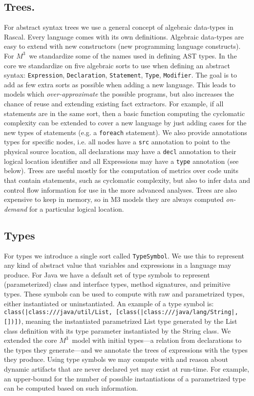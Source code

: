 \documentclass[conference]{IEEEtran}
\newcommand{\loc}[1]{\small{\texttt{#1}}\xspace}
\newcommand{\mthree}{\ensuremath{M^3}\xspace}
\begin{document}
\subsection{Trees.} For abstract syntax trees we use a general concept of
algebraic data-types in Rascal. Every language comes with its own definitions.
Algebraic data-types are easy to extend with new constructors (new programming
language constructs). For \mthree\ we standardize some of the names used in
defining AST types. In the core we standardize on five algebraic sorts to use
when defining an abstract syntax: \texttt{Expression}, \texttt{Declaration},
\texttt{Statement}, \texttt{Type}, \texttt{Modifier}. The goal is to add as
few extra sorts as possible when adding a new language. This leads to models
which \emph{over-approximate} the possible programs, but also increases the
chance of reuse and extending existing fact extractors. For example, if all
statements are in the same sort, then a basic function computing the
cyclomatic complexity can be extended to cover a new language by just adding
cases for the new types of statements (e.g. a \texttt{foreach} statement). We
also provide annotations types for specific nodes, i.e. all nodes have a
\texttt{src} annotation to point to the physical source location, all
declarations may have a \texttt{decl} annotation to their logical location
identifier and all Expressions may have a \texttt{type} annotation (see
below).
%
Trees are useful mostly for the computation of metrics over code units that
contain statements, such as cyclomatic complexity, but also to infer data and
control flow information for use in the more advanced analyses. Trees are also
expensive to keep in memory, so in M3 models they are always computed \emph
{on-demand} for a particular logical location.

\subsection{Types} For types we introduce a single sort called
\texttt{TypeSymbol}. We use this to represent any kind of abstract value that
variables and expressions in a language may produce. For Java we have a
default set of type symbols to represent (parameterized) class and interface
types, method signatures, and primitive types. These symbols can be used to
compute with raw and parametrized types, either instantiated or
uninstantiated. An example of a type symbol is:
\loc{class(|class:///java/util/List, [class(|class:///java/lang/String|,[])])}, 
meaning the instantiated
parametrized List type generated by the List class definition with its type
parameter instantiated by the String class. We extended the core \mthree\
model with initial types---a relation from declarations to the types they
generate---and we annotate the trees of expressions with the types they produce.
Using type symbols we may compute with and reason about dynamic artifacts that
are never declared yet may exist at run-time. For example, an upper-bound for
the number of possible instantiations of a parametrized type can be computed
based on such information.
\end{document}
